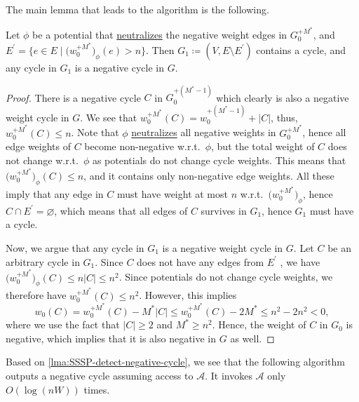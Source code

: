 The main lemma that leads to the algorithm is the following.

\begin{lemma}\label{lma:SSSP-detect-negative-cycle}
	Let \(\phi \) be a potential that \hyperref[def:neutralize]{neutralizes} the negative weight edges in \(G_0^{+M^{\ast} }\), and \(E^{\prime} = \{ e\in E \mid \big(w_0^{+M^{\ast} }\big)_{\phi } (e) > n \} \). Then \(G_1 \coloneqq (V, E \setminus E^{\prime} )\) contains a cycle, and any cycle in \(G_1\) is a negative cycle in \(G\).
\end{lemma}
\begin{proof}
	There is a negative cycle \(C\) in \(G_0^{+(M^{\ast} - 1)}\) which clearly is also a negative weight cycle in \(G\). We see that \(w_0^{+M^{\ast} }(C) = w_0^{+(M^{\ast} - 1)} + \lvert C \rvert \), thus, \(w_0^{+M^{\ast} }(C) \leq n\). Note that \(\phi \) \hyperref[def:neutralize]{neutralizes} all negative weights in \(G_0^{+M^{\ast} }\), hence all edge weights of \(C\) become non-negative w.r.t.\ \(\phi \), but the total weight of \(C\) does not change w.r.t.\ \(\phi \) as potentials do not change cycle weights. This means that \(\big(w_0^{+M^{\ast} }\big)_{\phi }(C) \leq n\), and it contains only non-negative edge weights. All these imply that any edge in \(C\) must have weight at most \(n\) w.r.t.\ \(\big(w_0^{+M^{\ast} }\big)_{\phi } \), hence \(C \cap E^{\prime} = \varnothing \), which means that all edges of \(C\) survives in \(G_1\), hence \(G_1\) must have a cycle.

	Now, we argue that any cycle in \(G_1\) is a negative weight cycle in \(G\). Let \(C\) be an arbitrary cycle in \(G_1\). Since \(C\) does not have any edges from \(E^{\prime} \) , we have \(\big(w_0^{+M^{\ast} }\big)_{\phi }(C) \leq n \lvert C \rvert \leq n^2\). Since potentials do not change cycle weights, we therefore have \(w_0^{+M^{\ast} }(C) \leq n^2\). However, this implies
	\[
		w_0(C)
		= w_0^{+M^{\ast} }(C) - M^{\ast} \lvert C \rvert
		\leq w_0^{+M^{\ast} }(C) - 2 M^{\ast}
		\leq n^2 - 2n^2
		< 0,
	\]
	where we use the fact that \(\lvert C \rvert \geq 2\) and \(M^{\ast} \geq n^2\). Hence, the weight of \(C\) in \(G_0\) is negative, which implies that it is also negative in \(G\) as well.
\end{proof}

Based on \autoref{lma:SSSP-detect-negative-cycle}, we see that the following algorithm outputs a negative cycle assuming access to \(\mathcal{A} \). It invokes \(\mathcal{A} \) only \(O(\log (nW))\) times.

